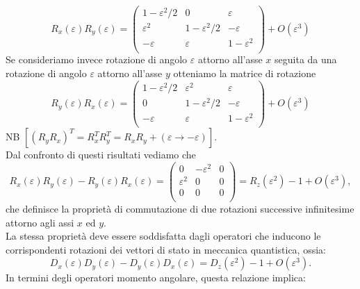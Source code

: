 \documentclass[a4paper,12pt,oneside]{book}
\begin{document}
\begin{equation}
R_x (\varepsilon)R_y (\varepsilon)=
\begin{pmatrix}
1-\varepsilon ^2/2 & 0 & \varepsilon \\
 \varepsilon ^2 & 1-\varepsilon ^2/2 & -\varepsilon \\
-  \varepsilon & \varepsilon & 1-\varepsilon ^2 \\
\end{pmatrix}
+ O(\varepsilon ^3)
\end{equation}
Se consideriamo invece rotazione di angolo $\varepsilon$ attorno all'asse $x$ seguita da una rotazione di angolo $\varepsilon$ attorno all'asse $y$ otteniamo la matrice di rotazione
\begin{equation}
R_y (\varepsilon)R_x (\varepsilon)=
\begin{pmatrix}
1-\varepsilon ^2/2 & \varepsilon ^2 & \varepsilon \\
 0 & 1-\varepsilon ^2/2 & -\varepsilon \\
-  \varepsilon & \varepsilon & 1-\varepsilon ^2 \\
\end{pmatrix}
+ O(\varepsilon ^3)
\end{equation}
NB $\displaystyle{\left[\left( R_y R_x\right) ^T = R_x ^T R_y ^T=R_xR_y+(\varepsilon\rightarrow -\varepsilon)\right]}$.\\
Dal confronto di questi risultati vediamo che
\begin{equation}
R_x (\varepsilon)R_y (\varepsilon)-R_y (\varepsilon)R_x (\varepsilon)=
\begin{pmatrix}
0 & - \varepsilon ^2 & 0 \\
 \varepsilon ^2 & 0 & 0 \\
0 & 0& 0\\
\end{pmatrix}
= R_z(\varepsilon ^2)-1+ O(\varepsilon ^3),
\end{equation}
che definisce la proprietà di commutazione di due rotazioni successive infinitesime attorno agli assi $x$ ed $y$.\\
La stessa proprietà deve essere soddisfatta dagli operatori che inducono le corrispondenti rotazioni dei vettori di stato in meccanica quantistica, ossia:
\begin{equation}
D_x (\varepsilon)D_y (\varepsilon)-D_y (\varepsilon)D_x (\varepsilon)=D_z(\varepsilon ^2)-1+ O(\varepsilon ^3).
\end{equation}
In termini degli operatori momento angolare, questa relazione implica:
\end{document}
